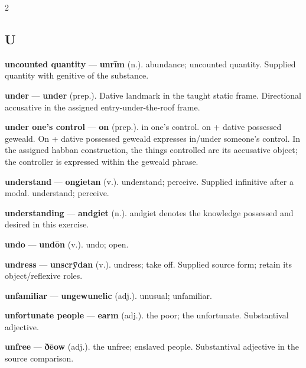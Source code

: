 \begin{multicols}{2}
\subsection*{U}
\textbf{uncounted quantity} — \textbf{unrīm} (n.). abundance; uncounted quantity. Supplied quantity with genitive of the substance.\par
\textbf{under} — \textbf{under} (prep.). Dative landmark in the taught static frame. Directional accusative in the assigned entry-under-the-roof frame.\par
\textbf{under one's control} — \textbf{on} (prep.). in one's control. on + dative possessed geweald. On + dative possessed geweald expresses in/under someone’s control. In the assigned habban construction, the things controlled are its accusative object; the controller is expressed within the geweald phrase.\par
\textbf{understand} — \textbf{ongietan} (v.). understand; perceive. Supplied infinitive after a modal. understand; perceive.\par
\textbf{understanding} — \textbf{andgiet} (n.). andgiet denotes the knowledge possessed and desired in this exercise.\par
\textbf{undo} — \textbf{undōn} (v.). undo; open.\par
\textbf{undress} — \textbf{unscrȳdan} (v.). undress; take off. Supplied source form; retain its object/reflexive roles.\par
\textbf{unfamiliar} — \textbf{ungewunelic} (adj.). unusual; unfamiliar.\par
\textbf{unfortunate people} — \textbf{earm} (adj.). the poor; the unfortunate. Substantival adjective.\par
\textbf{unfree} — \textbf{ðēow} (adj.). the unfree; enslaved people. Substantival adjective in the source comparison.\par

\end{multicols}
